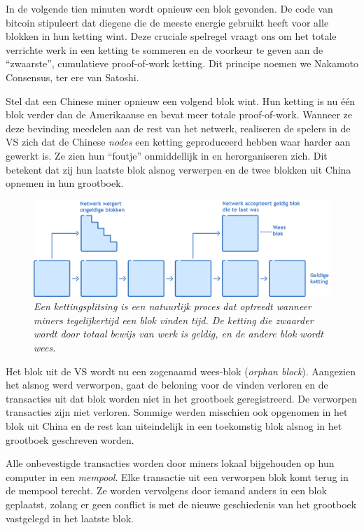 In de volgende tien minuten wordt opnieuw een blok gevonden. De code van bitcoin stipuleert dat diegene die de meeste energie gebruikt heeft voor alle blokken in hun ketting wint. Deze cruciale spelregel vraagt ons om het totale verrichte werk in een ketting te sommeren en de voorkeur te geven aan de “zwaarste”, cumulatieve proof-of-work ketting. Dit principe noemen we Nakamoto Consensus, ter ere van Satoshi.

Stel dat een Chinese miner opnieuw een volgend blok wint. Hun ketting is nu één blok verder dan de Amerikaanse en bevat meer totale proof-of-work. Wanneer ze deze bevinding meedelen aan de rest van het netwerk, realiseren de spelers in de VS zich dat de Chinese \textit{nodes} een ketting geproduceerd hebben waar harder aan gewerkt is. Ze zien hun “foutje” onmiddellijk in en herorganiseren zich. Dit betekent dat zij hun laatste blok alsnog verwerpen en de twee blokken uit China opnemen in hun grootboek.

\begin{figure}
    \centering
    \includegraphics[width=\textwidth]{images/fig12.png}
    \caption{\footnotesize{\textit{Een kettingsplitsing is een natuurlijk proces dat optreedt wanneer miners tegelijkertijd een blok vinden tijd. De ketting die zwaarder wordt door totaal bewijs van werk is geldig, en de andere blok wordt wees.}}}
    \label{fig12}
\end{figure}



Het blok uit de VS wordt nu een zogenaamd wees-blok (\textit{orphan block}). Aangezien het alsnog werd verworpen, gaat de beloning voor de vinden verloren en de transacties uit dat blok worden niet in het grootboek geregistreerd. De verworpen transacties zijn niet verloren. Sommige werden misschien ook opgenomen in het blok uit China en de rest kan uiteindelijk in een toekomstig blok alsnog in het grootboek geschreven worden.

Alle onbevestigde transacties worden door miners lokaal bijgehouden op hun computer in een \textit{mempool}. Elke transactie uit een verworpen blok komt terug in de mempool terecht. Ze worden vervolgens door iemand anders in een blok geplaatst, zolang er geen conflict is met de nieuwe geschiedenis van het grootboek vastgelegd in het laatste blok.

